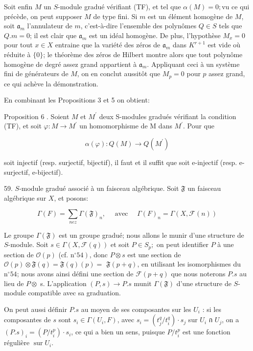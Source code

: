 Soit enfin $M$ un $S$-module gradué vérifiant (TF), et tel que $\alpha(M)=0 ; \mathrm{vu}$ ce qui précède, on peut supposer $M$ de type fini. Si $m$ est un élément homogène de $M$, soit $\mathfrak{a}_{m}$ l'annulateur de $m$, c'est-à-dire l'ensemble des polynômes $Q \in S$ tels que $Q . m=0$; il est clair que $\mathfrak{a}_{m}$ est un idéal homogène. De plus, l'hypothèse $M_{x}=0$ pour tout $x \in X$ entraine que la variété des zéros de $\mathfrak{a}_{m}$ dans $K^{r+1}$ est vide où réduite à $\{0\}$; le théorème des zéros de Hilbert montre alors que tout polynôme homogène de degré assez grand appartient à $\mathfrak{a}_{m}$. Appliquant ceci à un système fini de générateurs de $M$, on en conclut aussitôt que $M_{p}=0$ pour $p$ assez grand, ce qui achève la démonstration.

En combinant les Propositions 3 et 5 on obtient:

Proposition 6 . Soient $M$ et $M^{\prime}$ deux S-modules gradués vérifiant la condition (TF), et soit $\varphi: M \rightarrow M^{\prime}$ un homomorphisme de M dans $M^{\prime} .$ Pour que

$$
\alpha(\varphi): Q(M) \rightarrow Q\left(M^{\prime}\right)
$$

soit injectif (resp. surjectif, bijectif), il faut et il suffit que \varphi soit e-injectif (resp. e-surjectif, e-bijectif).

59. $S$-module gradué associé à un faisceau algébrique. Soit $\mathfrak{F}$ un faisceau algébrique sur $X$, et posons:

$$
\Gamma(F)=\sum_{n e z} \Gamma(\mathfrak{F})_{n}, \quad \text { avec } \quad \Gamma(F)_{n}=\Gamma(X, \mathcal{F}(n))
$$

Le groupe $\Gamma(\mathfrak{F})$ est un groupe gradué; nous allons le munir d'une structure de $S$-module. Soit $s \in \Gamma(X, \mathcal{F}(q))$ et soit $P \in S_{p} ;$ on peut identifier $P$ à une section de $\mathcal{O}(p)$ (cf. $\left.\mathrm{n}^{\circ} 54\right)$, donc $P \otimes s$ est une section de $\mathcal{O}(p) \otimes \mathfrak{F}(q)=\mathfrak{F}(q)(p)=$ $\mathfrak{F}(p+q)$, en utilisant les isomorphismes du $\mathrm{n}^{\circ} 54$; nous avons ainsi défini une section de $\mathcal{F}(p+q)$ que nous noterons $P . s$ au lieu de $P \otimes$ s. L'application $(P, s) \rightarrow P . s$ munit $\Gamma(\mathfrak{F})$ d'une structure de $S$-module compatible avec sa graduation.

On peut aussi définir $P . s$ au moyen de ses composantes sur les $U_{i}$ : si les composantes de $s$ sont $s_{i} \in \Gamma\left(U_{i}, F\right)$, avec $s_{i}=\left(t_{j}^{q} / t_{i}^{q}\right) \cdot s_{j}$ sur $U_{i}$ ก $U_{j}$, on a $(P . s)_{i}=\left(P / t_{i}^{p}\right) \cdot s_{i}$, ce qui a bien un sens, puisque $P / t_{i}^{p}$ est une fonction régulière $\operatorname{sur} U_{i}$.

